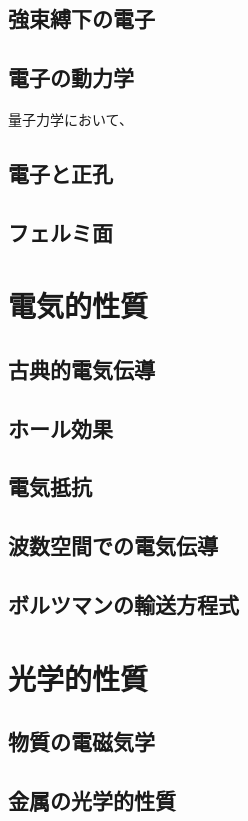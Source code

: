 \documentclass[a4paper]{jsreport}
\begin{document}
        \section{強束縛下の電子}

        \section{電子の動力学}
            量子力学において、

        \section{電子と正孔}

        \section{フェルミ面}

    \chapter{電気的性質}
        \section{古典的電気伝導}
        \section{ホール効果}
        \section{電気抵抗}
        \section{波数空間での電気伝導}
        \section{ボルツマンの輸送方程式}

    \chapter{光学的性質}
        \section{物質の電磁気学}
        \section{金属の光学的性質}
\end{document}
